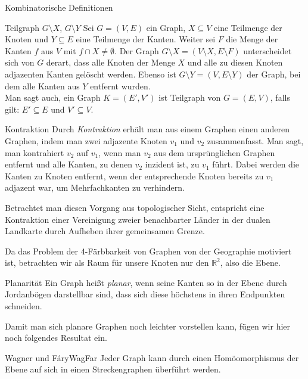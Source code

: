 \begin{section}{Kombinatorische Definitionen}
  \begin{definition}{Teilgraph $G\setminus X$, $G\setminus Y$}
   Sei $G=(V,E)$ ein Graph, $X \subseteq V$ eine Teilmenge der Knoten und $Y \subseteq E$ eine Teilmenge der Kanten. Weiter sei $F$ die Menge der Kanten $f$ aus $V$ mit $f \cap X \neq \emptyset$. Der Graph $G\setminus X = (V\setminus X,E\setminus F)$ unterscheidet sich von $G$ derart, dass alle Knoten der Menge $X$ und alle zu diesen Knoten adjazenten Kanten gelöscht werden. Ebenso ist $G\setminus Y = (V,E\setminus Y)$ der Graph, bei dem alle Kanten aus $Y$ entfernt wurden.\\
   Man sagt auch, ein Graph $K = (E',V')$ ist Teilgraph von $G = (E,V)$, falls gilt: $E' \subseteq E$ und $ V' \subseteq V$. 
  \end{definition}
  
  \begin{definition}{Kontraktion}
   Durch \textit{Kontraktion} erhält man aus einem Graphen einen anderen Graphen, indem man zwei adjazente Knoten $v_1$ und $v_2$ zusammenfasst. Man sagt, man kontrahiert $v_2$ auf $v_1$, wenn man $v_2$ aus dem ursprünglichen Graphen entfernt und alle Kanten, zu denen $v_2$ inzident ist, zu $v_1$ führt. Dabei werden die Kanten zu Knoten entfernt, wenn der entsprechende Knoten bereits zu $v_1$ adjazent war, um Mehrfachkanten zu verhindern.
  \end{definition}

  Betrachtet man diesen Vorgang aus topologischer Sicht, entspricht eine Kontraktion einer Vereinigung zweier benachbarter Länder in der dualen Landkarte durch Aufheben ihrer gemeinsamen Grenze.
  
  Da das Problem der 4-Färbbarkeit von Graphen von der Geographie motiviert ist, betrachten wir als Raum für unsere Knoten nur den $\mathbb{R}^2$, also die Ebene.
  
  \begin{definition}{Planarität}
   Ein Graph heißt \textit{planar}, wenn seine Kanten so in der Ebene durch Jordanbögen darstellbar sind, dass sich diese höchstens in ihren Endpunkten schneiden.
  \end{definition}
  
  Damit man sich planare Graphen noch leichter vorstellen kann, fügen wir hier noch folgendes Resultat ein.
  
  \begin{satzl}{Wagner und Fáry}{WagFar}
   Jeder Graph kann durch einen Homöomorphismus der Ebene auf sich in einen Streckengraphen überführt werden.
  \end{satzl}
  

\end{section}
